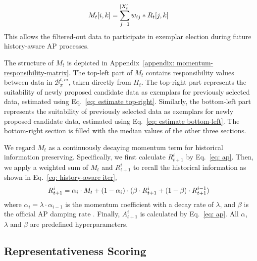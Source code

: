 \begin{equation}
\small
\label{eq: estimate bottom-left}
        M_t[i,k] = \sum_{j=1}^{|X'_{t}|} w_{ij} * R_t[j,k]    
\end{equation}
This allows the filtered-out data to participate in exemplar election during future history-aware AP processes.



The structure of $M_t$ is depicted in Appendix~\ref{appendix: momentum-responsibility-matrix}. The top-left part of $M_t$ contains responsibility values between data in \(\mathcal{B}^{t, m}_\pi\), taken directly from \(H_t\). The top-right part represents the suitability of newly proposed candidate data as exemplars for previously selected data, estimated using Eq.~\ref{eq: estimate top-right}. Similarly, the bottom-left part represents the suitability of previously selected data as exemplars for newly proposed candidate data, estimated using Eq.~\ref{eq: estimate bottom-left}. 
The bottom-right section is filled with the median values of the other three sections.

We regard $M_t$ as a continuously decaying momentum term for historical information preserving.
Specifically, we first calculate $R_{t+1}^{i}$ by Eq.~\ref{eq: ap}. Then, we apply a weighted sum of $M_t$ and $R_{t+1}^{i}$ to recall the historical information as shown in Eq.~\ref{eq: history-aware iter},
\begin{equation}
\small
\label{eq: history-aware iter}
        R_{t+1}^{i} = \alpha_i \cdot M_t + (1-\alpha_i) \cdot (\beta \cdot R_{t+1}^{i} + (1-\beta) \cdot R_{t+1}^{i-1}) 
\end{equation}
where $\alpha_i = \lambda \cdot \alpha_{i-1}$ is the momentum coefficient with a decay rate of $\lambda$, and $\beta$ is the official AP damping rate \citep{cluster-ap}.
Finally, $A_{t+1}^{i}$ is calculated by Eq.~\ref{eq: ap}. All $\alpha$, $\lambda$ and $\beta$ are predefined hyperparameters. 

\subsection{Representativeness Scoring}

